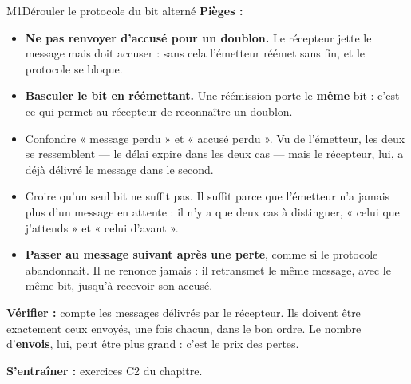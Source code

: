 \begin{fichemethode}{M1}{Dérouler le protocole du bit alterné}
\textbf{Pièges :}
\begin{itemize}
  \item \textbf{Ne pas renvoyer d'accusé pour un doublon.} Le récepteur jette le message
    mais doit accuser : sans cela l'émetteur réémet sans fin, et le protocole se bloque.
  \item \textbf{Basculer le bit en réémettant.} Une réémission porte le \textbf{même} bit :
    c'est ce qui permet au récepteur de reconnaître un doublon.
  \item Confondre « message perdu » et « accusé perdu ». Vu de l'émetteur, les deux se
    ressemblent — le délai expire dans les deux cas — mais le récepteur, lui, a déjà délivré
    le message dans le second.
  \item Croire qu'un seul bit ne suffit pas. Il suffit parce que l'émetteur n'a jamais plus
    d'un message en attente : il n'y a que deux cas à distinguer, « celui que j'attends » et
    « celui d'avant ».
  \item \textbf{Passer au message suivant après une perte}, comme si le protocole
    abandonnait. Il ne renonce jamais : il retransmet le même message, avec le même bit,
    jusqu'à recevoir son accusé.
\end{itemize}

\textbf{Vérifier :} compte les messages délivrés par le récepteur. Ils doivent être
exactement ceux envoyés, une fois chacun, dans le bon ordre. Le nombre d'\textbf{envois},
lui, peut être plus grand : c'est le prix des pertes.

\textbf{S'entraîner :} exercices C2 du chapitre.
\end{fichemethode}
